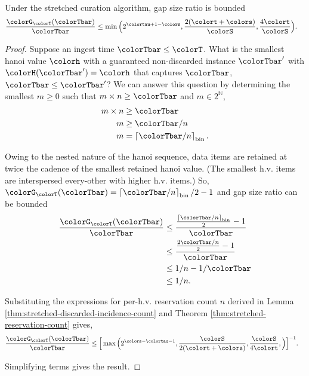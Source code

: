 \begin{theorem}
\label{thm:stretched-gap-size}
Under the stretched curation algorithm, gap size ratio is bounded
\begin{align*}
\frac{\colorG_{\colorT}(\colorTbar)}{\colorTbar}
&\leq
\min\Big(
  2^{\colortau+1-\colors}
  ,
  \frac{2(\colort + \colors)}{\colorS},
  \frac{4\colort}{\colorS}
\Big).
\end{align*}
\end{theorem}
\begin{proof}

Suppose an ingest time $\colorTbar \leq \colorT$.
What is the smallest hanoi value $\colorh$ with a guaranteed non-discarded instance $\colorTbar'$ with $\colorH(\colorTbar') = \colorh$ that captures $\colorTbar$, $\colorTbar \leq \colorTbar'$?
We can answer this question by determining the smallest $m \geq 0$ such that $m \times n \geq \colorTbar$ and $m \in 2^{\mathbb{N}}$,
\begin{align*}
m \times n
&\geq \colorTbar\\
m
&\geq \colorTbar / n\\
m
&= \left\lceil \colorTbar / n \right\rceil_{\mathrm{bin}}.
\end{align*}

Owing to the nested nature of the hanoi sequence, data items are retained at twice the cadence of the smallest retained hanoi value.
(The smallest h.v. items are interspersed every-other with higher h.v. items.)
So, $\colorG_{\colorT}(\colorTbar) = \left\lceil \colorTbar / n \right\rceil_{\mathrm{bin}}/2 - 1$ and gap size ratio can be bounded
\begin{align*}
\frac{\colorG_{\colorT}(\colorTbar)}{\colorTbar}
&\leq
\frac{
\frac{\left\lceil \colorTbar / n \right\rceil_{\mathrm{bin}}}{2} - 1
}{
\colorTbar
}\\
&\leq
\frac{
\frac{2\colorTbar / n}{2} - 1
}{
\colorTbar
}\\
&\leq
1 / n - 1 / \colorTbar\\
&\leq
1 / n.
\end{align*}

Substituting the expressions for per-h.v. reservation count $n$ derived in Lemma \ref{thm:stretched-discarded-incidence-count} and Theorem \ref{thm:stretched-reservation-count} gives,
\begin{align*}
  \frac{\colorG_{\colorT}(\colorTbar)}{\colorTbar}
  &\leq
  \Big[
    \max\Big(
      2^{\colors - \colortau - 1},
      \frac{\colorS}{2(\colort + \colors)},
      \frac{\colorS}{4\colort},
    \Big)
  \Big]^{-1}.
\end{align*}

Simplifying terms gives the result.

\end{proof}
